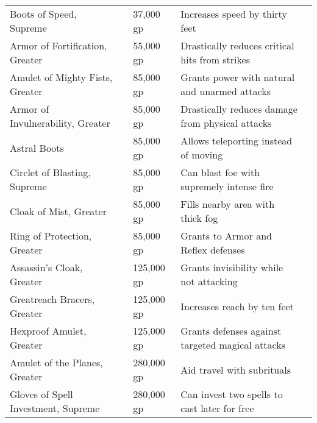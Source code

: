 \begin{longtabuwrapper}
\begin{longtabu}{l l l X l}
Boots of Speed, Supreme &  & 37,000 gp & Increases speed by thirty feet & \pageref{item:Boots of Speed, Supreme} \\
Armor of Fortification, Greater &  & 55,000 gp & Drastically reduces critical hits from strikes & \pageref{item:Armor of Fortification, Greater} \\
Amulet of Mighty Fists, Greater &  & 85,000 gp & Grants  power with natural and unarmed attacks & \pageref{item:Amulet of Mighty Fists, Greater} \\
Armor of Invulnerability, Greater &  & 85,000 gp & Drastically reduces damage from physical attacks & \pageref{item:Armor of Invulnerability, Greater} \\
Astral Boots &  & 85,000 gp & Allows teleporting instead of moving & \pageref{item:Astral Boots} \\
Circlet of Blasting, Supreme &  & 85,000 gp & Can blast foe with supremely intense fire & \pageref{item:Circlet of Blasting, Supreme} \\
Cloak of Mist, Greater &  & 85,000 gp & Fills nearby area with thick fog & \pageref{item:Cloak of Mist, Greater} \\
Ring of Protection, Greater &  & 85,000 gp & Grants  to Armor and Reflex defenses & \pageref{item:Ring of Protection, Greater} \\
Assassin's Cloak, Greater &  & 125,000 gp & Grants invisibility while not attacking & \pageref{item:Assassin's Cloak, Greater} \\
Greatreach Bracers, Greater &  & 125,000 gp & Increases reach by ten feet & \pageref{item:Greatreach Bracers, Greater} \\
Hexproof Amulet, Greater &  & 125,000 gp & Grants  defenses against targeted magical attacks & \pageref{item:Hexproof Amulet, Greater} \\
Amulet of the Planes, Greater &  & 280,000 gp & Aid travel with  subrituals & \pageref{item:Amulet of the Planes, Greater} \\
Gloves of Spell Investment, Supreme &  & 280,000 gp & Can invest two spells to cast later for free & \pageref{item:Gloves of Spell Investment, Supreme} \\
\end{longtabu}
\end{longtabuwrapper}
